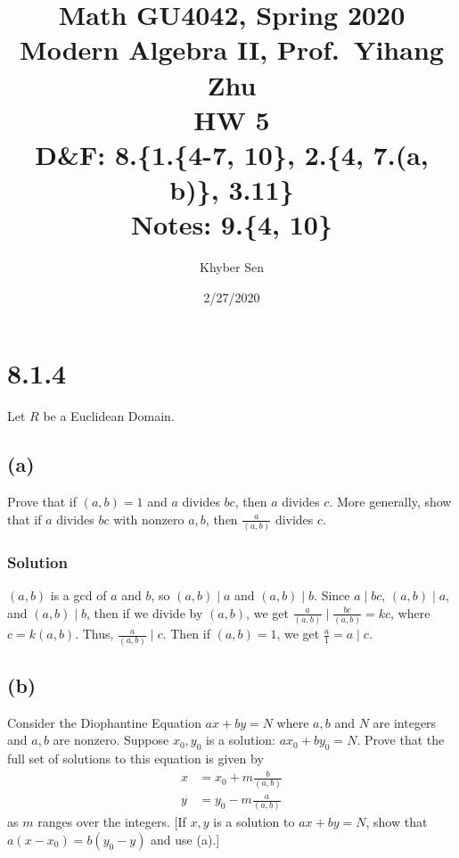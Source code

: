 \documentclass[fleqn]{article}
\title{
Math GU4042, Spring 2020 \\
Modern Algebra II, Prof.\ Yihang Zhu \\
HW 5 \\
D\&F: 8.\{1.\{4-7, 10\}, 2.\{4, 7.(a, b)\}, 3.11\} \\
Notes: 9.\{4, 10\} \\
}
\author{Khyber Sen}
\date{2/27/2020}
\begin{document}
    
    \maketitle
    
    \section{8.1.4}
    Let $R$ be a Euclidean Domain.
        
        \subsection{(a)}
        Prove that if $(a, b) = 1$ and $a$ divides $bc$, then $a$ divides $c$.  More generally, show that if $a$ divides $bc$ with nonzero $a, b$, then $\frac{a}{(a, b)}$ divides $c$.
            
            \subsubsection{Solution}
            $(a, b)$ is a gcd of $a$ and $b$, so $(a, b) \mid a$ and $(a, b) \mid b$.  Since $a \mid bc$, $(a, b) \mid a$, and $(a, b) \mid b$, then if we divide by $(a, b)$, we get $\frac{a}{(a, b)} \mid \frac{bc}{(a, b)} = kc$, where $c = k (a, b)$.  Thus, $\frac{a}{(a, b)} \mid c$.  Then if $(a, b) = 1$, we get $\frac{a}{1} = a \mid c$.
        
        \subsection{(b)}
        Consider the Diophantine Equation $ax + by = N$ where $a, b$ and $N$ are integers and $a, b$ are nonzero.  Suppose $x_0, y_0$ is a solution: $ax_0 + by_0 = N$.  Prove that the full set of solutions to this equation is given by
        \begin{align}
            x &= x_0 + m \frac{b}{(a, b)} \\
            y &= y_0 - m \frac{a}{(a, b)}
        \end{align}
        as $m$ ranges over the integers.  [If $x, y$ is a solution to $ax + by = N$, show that $a(x - x_0) = b(y_0 - y)$ and use (a).]
        
\end{document}
